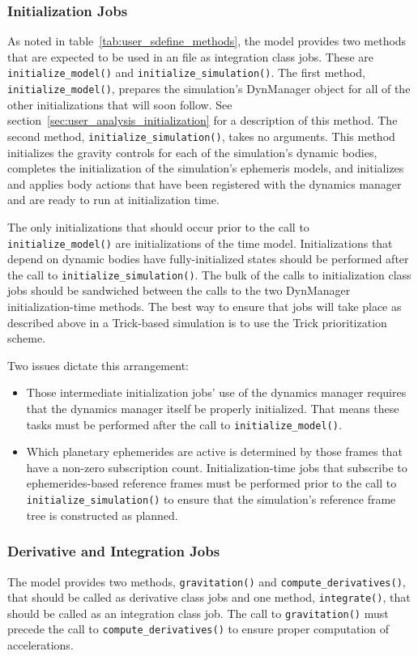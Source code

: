 \subsubsection{Initialization Jobs}\label{sec:user_integration_initialization}
As noted in table~\ref{tab:user_sdefine_methods}, the model provides
two methods that are expected to be used in an \Sdefine file as
integration class jobs. These are \verb+initialize_model()+ and
\verb+initialize_simulation()+.
The first method, \verb+initialize_model()+, prepares the simulation's
DynManager object for all of the other initializations that will soon follow.
See section~\ref{sec:user_analysis_initialization}
for a description of this method.
The second method, \verb+initialize_simulation()+, takes no arguments.
This method
initializes the gravity controls for each of the simulation's dynamic bodies,
completes the initialization of the simulation's ephemeris models, and
initializes and applies body actions that have been registered with the
dynamics manager and are ready to run at initialization time.

The only initializations that should occur prior to the call to
\verb+initialize_model()+ are initializations of the time model.
Initializations that depend on dynamic bodies have fully-initialized states
should be performed after the call to \verb+initialize_simulation()+.
The bulk of the calls to initialization class jobs should be sandwiched
between the calls to the two DynManager initialization-time methods.
The best way to ensure that jobs will take place as described above
in a Trick-based simulation is to use the Trick prioritization scheme.

Two issues dictate this arrangement:\begin{itemize}
\item Those intermediate initialization jobs' use of the dynamics manager
  requires that the dynamics manager itself be properly initialized.
  That means these tasks must be performed after the call to
  \verb+initialize_model()+.
\item  Which planetary ephemerides are active is determined by those frames
  that have a non-zero subscription count. Initialization-time jobs that
  subscribe to ephemerides-based reference frames must be performed prior
  to the call to \verb+initialize_simulation()+ to ensure that the
  simulation's reference frame tree is constructed as planned.
\end{itemize}

\subsubsection{Derivative and Integration Jobs}
\label{sec:user_integration_dynamics}
The model provides two methods,
\verb+gravitation()+ and \verb+compute_derivatives()+,
that should be called as derivative class jobs and
one method, \verb+integrate()+,
that should be called as an integration class job.
The call to \verb+gravitation()+ must precede the call to
\verb+compute_derivatives()+ to ensure proper computation of accelerations.

